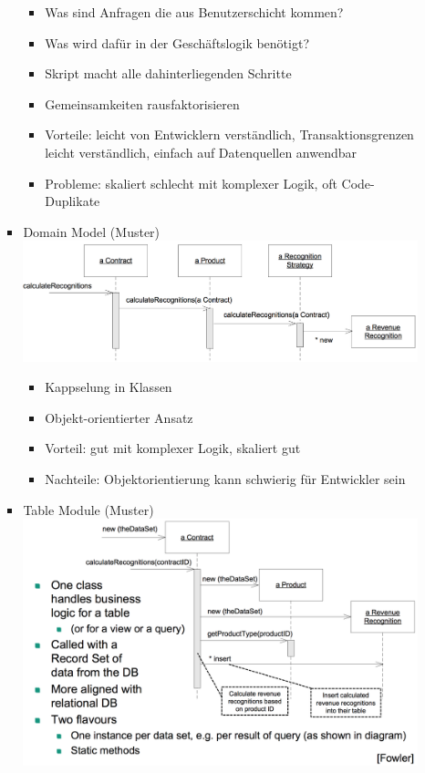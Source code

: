 \documentclass[paper=a4, fontsize=11pt]{scrartcl} %
\numberwithin{equation}{section} %
\numberwithin{figure}{section} %
\numberwithin{table}{section} %
\begin{document}
\begin{itemize}
\begin{itemize}
\begin{itemize}
      \begin{itemize}
        \item Was sind Anfragen die aus Benutzerschicht kommen?
        \item Was wird dafür in der Geschäftslogik benötigt?
        \item Skript macht alle dahinterliegenden Schritte
        \item Gemeinsamkeiten rausfaktorisieren
        \item Vorteile: leicht von Entwicklern verständlich, Transaktionsgrenzen leicht verständlich, einfach auf Datenquellen anwendbar
        \item Probleme: skaliert schlecht mit komplexer Logik, oft Code-Duplikate
      \end{itemize}
      \item Domain Model (Muster)\\
      \includegraphics[width=.7\textwidth]{imgs/domainmodel}
      \begin{itemize}
        \item Kappselung in Klassen
        \item Objekt-orientierter Ansatz
        \item Vorteil: gut mit komplexer Logik, skaliert gut
        \item Nachteile: Objektorientierung kann schwierig für Entwickler sein
      \end{itemize}
      \item Table Module (Muster)\\
      \includegraphics[width=.7\textwidth]{imgs/tablemodulefull}
      \begin{itemize}

\end{itemize}
\end{itemize}
\end{itemize}
\end{itemize}
\end{document}

